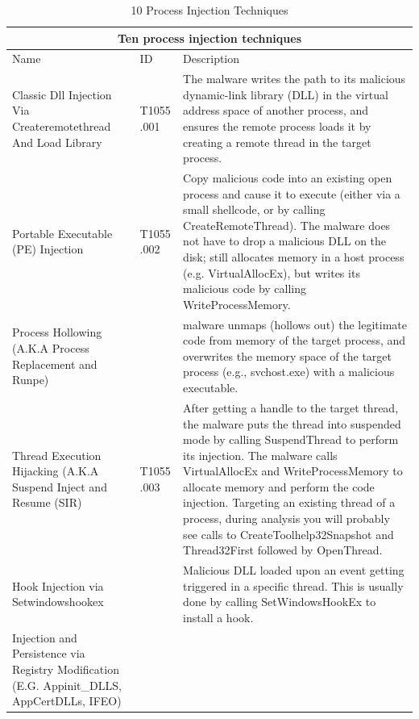 \documentclass{article}
\begin{document}
\begin{table}[h!]
\centering
\caption{10 Process Injection Techniques \autocite{Hosseini:2017}}
\begin{tabular}{ |p{3.5cm}||p{1.2cm}|p{10cm}|  }
  \hline
  \multicolumn{3}{|c|}{Ten process injection techniques} \\
  \hline
  Name	& ID & Description \\
  \hline
  Classic Dll Injection Via Createremotethread And Load Library
        & T1055 .001
             & The malware writes the path to its malicious dynamic-link
               library (DLL) in the virtual address space of another process,
               and ensures the remote process loads it by creating a remote thread in the target process. \\
  \hline
  Portable Executable (PE) Injection
        & T1055 .002
             & Copy malicious code into an existing open process and cause it to execute (either via a
               small shellcode, or by calling CreateRemoteThread). The malware does not have to drop a
               malicious DLL on the disk; still allocates memory in a host process (e.g. VirtualAllocEx),
               but writes its malicious code by calling WriteProcessMemory. \\
  \hline
  Process Hollowing (A.K.A Process Replacement and Runpe)
        &
             & malware unmaps (hollows out) the legitimate code from memory of the target process, and
               overwrites the memory space of the target process (e.g., svchost.exe) with a malicious executable.\\
  \hline
  Thread Execution Hijacking (A.K.A Suspend Inject and Resume (SIR)
        & T1055 .003
             & After getting a handle to the target thread, the malware puts the thread into suspended mode by
               calling SuspendThread to perform its injection. The malware calls VirtualAllocEx and
               WriteProcessMemory to allocate memory and perform the code injection. Targeting an existing thread
               of a process, during analysis you will probably see calls to CreateToolhelp32Snapshot and
               Thread32First followed by OpenThread. \\
  \hline
  Hook Injection via Setwindowshookex
        &
             & Malicious DLL loaded upon an event getting triggered in a specific thread. This is usually
               done by calling SetWindowsHookEx to install a hook. \\
  \hline
  Injection and Persistence via Registry Modification (E.G. Appinit\_DLLS, AppCertDLLs, IFEO)

\end{tabular}
\end{table}
\end{document}
